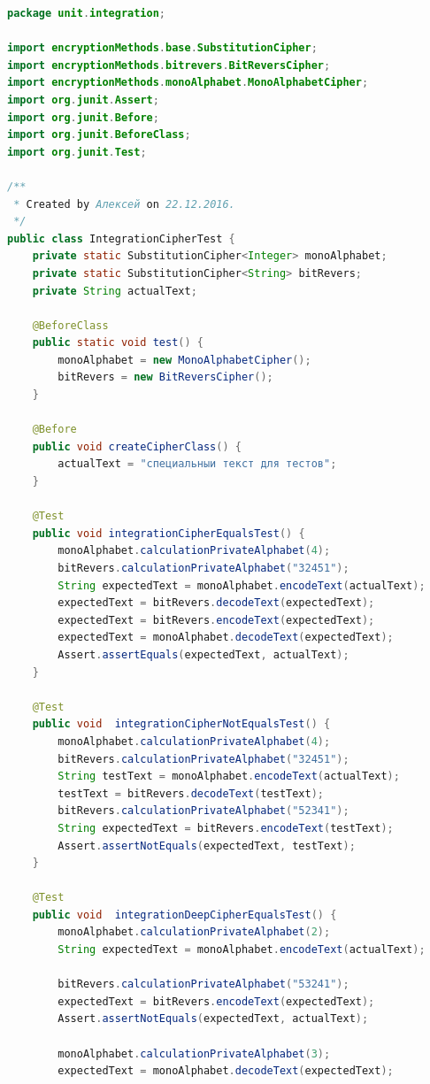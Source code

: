 \documentclass[a4paper,12pt]{article}
\begin{document}
\newpage
\begin{lstlisting}[language=java, caption=код модуля IntegrationCipherTest.java]
package unit.integration;

import encryptionMethods.base.SubstitutionCipher;
import encryptionMethods.bitrevers.BitReversCipher;
import encryptionMethods.monoAlphabet.MonoAlphabetCipher;
import org.junit.Assert;
import org.junit.Before;
import org.junit.BeforeClass;
import org.junit.Test;

/**
 * Created by Алексей on 22.12.2016.
 */
public class IntegrationCipherTest {
    private static SubstitutionCipher<Integer> monoAlphabet;
    private static SubstitutionCipher<String> bitRevers;
    private String actualText;

    @BeforeClass
    public static void test() {
        monoAlphabet = new MonoAlphabetCipher();
        bitRevers = new BitReversCipher();
    }

    @Before
    public void createCipherClass() {
        actualText = "специальныи текст для тестов";
    }

    @Test
    public void integrationCipherEqualsTest() {
        monoAlphabet.calculationPrivateAlphabet(4);
        bitRevers.calculationPrivateAlphabet("32451");
        String expectedText = monoAlphabet.encodeText(actualText);
        expectedText = bitRevers.decodeText(expectedText);
        expectedText = bitRevers.encodeText(expectedText);
        expectedText = monoAlphabet.decodeText(expectedText);
        Assert.assertEquals(expectedText, actualText);
    }

    @Test
    public void  integrationCipherNotEqualsTest() {
        monoAlphabet.calculationPrivateAlphabet(4);
        bitRevers.calculationPrivateAlphabet("32451");
        String testText = monoAlphabet.encodeText(actualText);
        testText = bitRevers.decodeText(testText);
        bitRevers.calculationPrivateAlphabet("52341");
        String expectedText = bitRevers.encodeText(testText);
        Assert.assertNotEquals(expectedText, testText);
    }

    @Test
    public void  integrationDeepCipherEqualsTest() {
        monoAlphabet.calculationPrivateAlphabet(2);
        String expectedText = monoAlphabet.encodeText(actualText);

        bitRevers.calculationPrivateAlphabet("53241");
        expectedText = bitRevers.encodeText(expectedText);
        Assert.assertNotEquals(expectedText, actualText);

        monoAlphabet.calculationPrivateAlphabet(3);
        expectedText = monoAlphabet.decodeText(expectedText);


\end{lstlisting}
\end{document}
